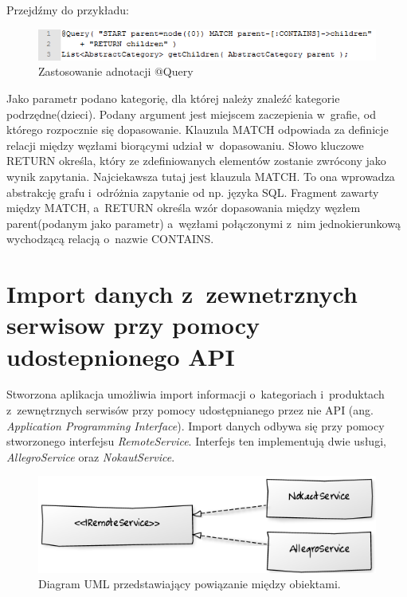 Przejdźmy do przykładu:

\begin{figure}[H]
	\centering
	\includegraphics{images/query.png}
	\caption{Zastosowanie adnotacji @Query}
\end{figure}

Jako parametr podano kategorię, dla której należy znaleźć kategorie podrzędne(dzieci). Podany argument jest miejscem zaczepienia w~grafie, od którego rozpocznie się dopasowanie. Klauzula MATCH odpowiada za definicje relacji między węzłami biorącymi udział w~dopasowaniu. Słowo kluczowe RETURN określa, który ze zdefiniowanych elementów zostanie zwrócony jako wynik zapytania. Najciekawsza tutaj jest klauzula MATCH. To ona wprowadza abstrakcję grafu i~odróżnia zapytanie od np. języka SQL. Fragment zawarty między MATCH, a~RETURN określa wzór dopasowania między węzłem parent(podanym jako parametr) a~węzłami połączonymi z~nim jednokierunkową wychodzącą relacją o~nazwie CONTAINS. 

\section{Import danych z~zewnetrznych serwisow przy pomocy udostepnionego API}

Stworzona aplikacja umożliwia import informacji o~kategoriach i~produktach z~zewnętrznych serwisów przy pomocy udostępnianego przez nie API (ang. \textit{Application Programming Interface}). Import danych odbywa się przy pomocy stworzonego interfejsu \textit{RemoteService}. Interfejs ten implementują dwie usługi, \textit{AllegroService} oraz \textit{NokautService}.

\begin{figure}[h]
	\centering
	\includegraphics[scale=1]{images/uml_remote_service2.png}
	\caption{Diagram UML przedstawiający powiązanie między obiektami.}
\end{figure}

